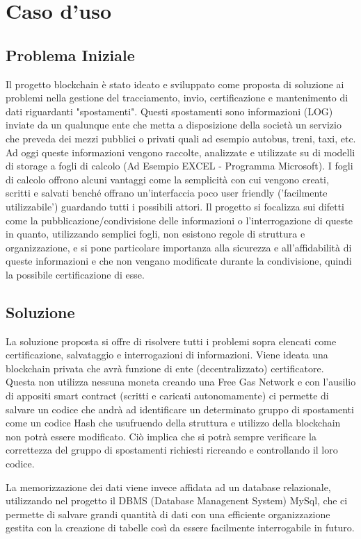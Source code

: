 \documentclass[11pt,a4paper,titlepage,twoside,openright]{report}
\begin{document}
\chapter{Caso d'uso}

\section{Problema Iniziale}
Il progetto blockchain è stato ideato e sviluppato come proposta di soluzione ai problemi nella gestione del tracciamento, invio, certificazione e mantenimento di dati riguardanti "spostamenti". Questi spostamenti sono informazioni (LOG) inviate da un qualunque ente che metta a disposizione della società un servizio che preveda dei mezzi pubblici o privati quali ad esempio autobus, treni, taxi, etc. Ad oggi queste informazioni vengono raccolte, analizzate e utilizzate su di modelli di storage a fogli di calcolo (Ad Esempio EXCEL - Programma Microsoft). I fogli di calcolo offrono alcuni vantaggi come la semplicità con cui vengono creati, scritti e salvati benché offrano un'interfaccia poco user friendly ('facilmente utilizzabile') guardando tutti i possibili attori. Il progetto si focalizza sui difetti come la pubblicazione/condivisione delle informazioni o l'interrogazione di queste in quanto, utilizzando semplici fogli, non esistono regole di struttura e organizzazione, e si pone particolare importanza alla sicurezza e all'affidabilità di queste informazioni e che non vengano modificate durante la condivisione, quindi la possibile certificazione di esse.

\section{Soluzione}
La soluzione proposta si offre di risolvere tutti i problemi sopra elencati come certificazione, salvataggio e interrogazioni di informazioni. Viene ideata una blockchain privata che avrà funzione di ente (decentralizzato) certificatore. Questa non utilizza nessuna moneta creando una Free Gas Network e con l'ausilio di appositi smart contract (scritti e caricati autonomamente) ci permette di salvare un codice che andrà ad identificare un determinato gruppo di spostamenti come un codice Hash che usufruendo della struttura e utilizzo della blockchain non potrà essere modificato. Ciò implica che si potrà sempre verificare la correttezza del gruppo di spostamenti richiesti ricreando e controllando il loro codice.

La memorizzazione dei dati viene invece affidata ad un database relazionale, utilizzando nel progetto il DBMS (Database Managenent System) MySql, che ci permette di salvare grandi quantità di dati con una efficiente organizzazione gestita con la creazione di tabelle così da essere facilmente interrogabile in futuro.
 
\end{document}
